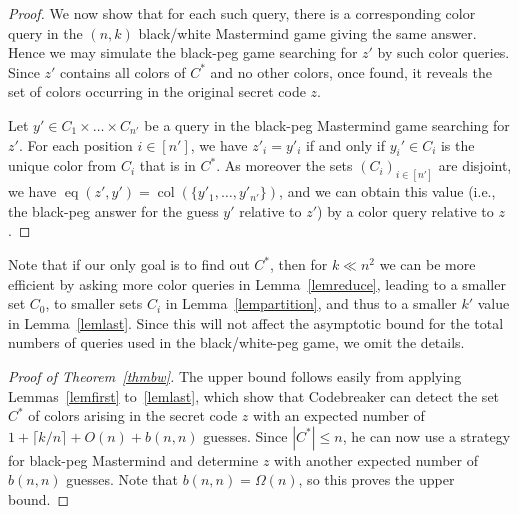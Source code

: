 \documentclass[english,a4paper,11pt]{article}
\newcommand{\comment}[1]{{\bf [#1]}}
\newcommand{\BD}[1]{\comment{\textcolor{blue}{BD: #1}}}
\DeclareMathOperator{\eq}{eq}
\DeclareMathOperator{\col}{col}
\begin{document}
{\begin{proof}
  We now show that for each such query, there is a corresponding color query in the $(n,k)$ black/white Mastermind game giving the same answer. Hence we may simulate the black-peg game searching for $z'$ by such color queries. Since $z'$ contains all colors of $C^*$ and no other colors, once found, it reveals the set of colors occurring in the original secret code $z$.
  
  Let $y' \in C_1 \times \ldots \times C_{n'}$ be a query in the black-peg Mastermind game searching for $z'$. For each position $i\in[n']$, we have $z'_i=y'_i$ if and only if $y_i'\in C_i$ is the unique color from $C_i$ that is in $C^*$. As moreover the sets $(C_i)_{i\in [n']}$ are disjoint, we have $\eq(z',y') = \col(\{y'_1, \ldots, y'_{n'}\})$, and we can obtain this value (i.e., the black-peg answer for the guess $y'$ relative to $z'$)  by a color query relative to $z$.
  \end{proof}
  

%  

Note that if our only goal is to find out $C^*$, then for $k \ll n^2$ we can be more efficient by asking more color queries in Lemma~\ref{lemreduce}, leading to a smaller set $C_0$, to smaller sets $C_i$ in Lemma~\ref{lempartition}, and thus to a smaller $k'$ value in Lemma~\ref{lemlast}. Since this will not affect the asymptotic bound for the total numbers of queries used in the black/white-peg game, we omit the details. 

  
\begin{proof}[Proof of Theorem~\ref{thmbw}]
The upper bound follows easily from applying Lemmas~\ref{lemfirst} to~\ref{lemlast}, which show that Codebreaker can detect the set $C^*$ of colors arising in the secret code $z$ with an expected number of $1 + \lceil k/n \rceil + O(n) + b(n,n)$ guesses. Since $|C^*| \le n$, he can now use a strategy for black-peg Mastermind and determine $z$ with another expected number of $b(n,n)$ guesses. Note that $b(n,n) = \Omega(n)$, so this proves the upper bound.


\end{proof}}
\end{document}
